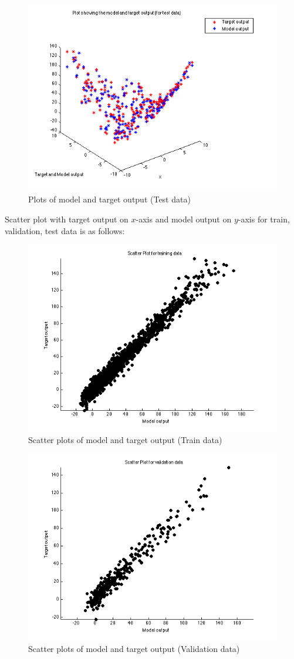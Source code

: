 \documentclass{article}
\begin{document}
\begin{figure}[H]
\centering
\includegraphics[width=0.5\linewidth]{Regression/rbfnn_bivariate/output_test.png}
\caption{Plots of model and target output (Test data)}
\end{figure}

Scatter plot with target output on $x$-axis and model output on $y$-axis for train, validation, test data is as follows:

\begin{figure}[H]
\centering
\includegraphics[width=0.5\linewidth]{Regression/rbfnn_bivariate/scatter_train.png}
\caption{Scatter plots of model and target output (Train data)}
\end{figure}

\begin{figure}[H]
\centering
\includegraphics[width=0.5\linewidth]{Regression/rbfnn_bivariate/scatter_val.png}
\caption{Scatter plots of model and target output (Validation data)}
\end{figure}
\end{document}
